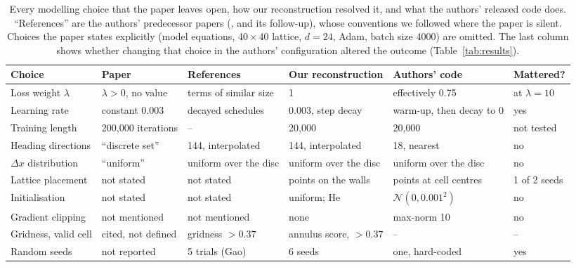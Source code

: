 \documentclass[10pt,letterpaper]{article}
\begin{document}
\begin{table}[H]
\centering
\captionsetup{font=sf, width=0.95\linewidth, skip=7pt}
\caption{ Every modelling choice that the paper leaves open, how our reconstruction resolved it, and what the authors' released code does. ``References'' are the authors' predecessor papers (\citealp{gao2021path}, and its follow-up), whose conventions we followed where the paper is silent. Choices the paper states explicitly (model equations, 40\,$\times$\,40 lattice, $d=24$, Adam, batch size 4000) are omitted. The last column shows whether changing that choice in the authors' configuration altered the outcome (Table~\ref{tab:results}).}
\small
\begin{tabular}{L{2.1cm}L{2.3cm}L{2.7cm}L{2.7cm}L{2.5cm}L{1.5cm}}
\toprule
Choice & Paper & References & Our reconstruction & Authors' code & Mattered? \\
\midrule
Loss weight $\lambda$ & $\lambda>0$, no value & terms of similar size & 1 & effectively 0.75 & at $\lambda=10$ \\
Learning rate & constant 0.003 & decayed schedules & 0.003, step decay & warm-up, then decay to 0 & yes \\
Training length & 200{,}000 iterations & -- & 20{,}000 & 20{,}000 & not tested \\
Heading directions & ``discrete set'' & 144, interpolated & 144, interpolated & 18, nearest & no \\
$\Delta x$ distribution & ``uniform'' & uniform over the disc & uniform over the disc & uniform over the disc & no \\
Lattice placement & not stated & not stated & points on the walls & points at cell centres & 1 of 2 seeds \\
Initialisation & not stated & not stated & uniform; He & $\mathcal{N}(0, 0.001^2)$ & no \\
Gradient clipping & not mentioned & not mentioned & none & max-norm 10 & no \\
Gridness, valid cell & cited, not defined & gridness $>0.37$ & annulus score, $>0.37$ & -- & -- \\
Random seeds & not reported & 5 trials (Gao) & 6 seeds & one, hard-coded & yes \\
\bottomrule
\end{tabular}
\label{tab:choices}
\end{table}
\end{document}
